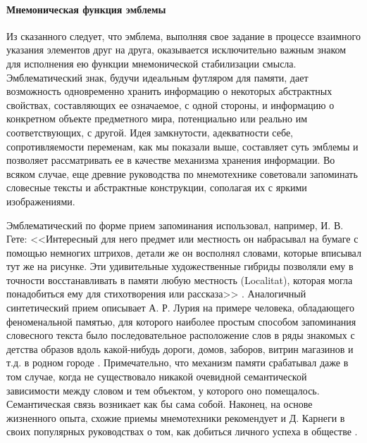\paragraph{Мнемоническая функция эмблемы}

Из сказанного следует, что эмблема, выполняя свое задание в процессе взаимного указания элементов
друг на друга, оказывается исключительно важным знаком для исполнения ею функции мнемонической
стабилизации смысла. Эмблематический знак, будучи идеальным футляром для памяти, дает возможность
одновременно хранить информацию о некоторых абстрактных свойствах, составляющих ее означаемое, с
одной стороны, и информацию о конкретном объекте предметного мира, потенциально или реально им
соответствующих, с другой. Идея замкнутости, адекватности себе, сопротивляемости переменам, как мы
показали выше, составляет суть эмблемы и позволяет рассматривать ее в качестве механизма хранения
информации. Во всяком случае, еще древние руководства по мнемотехнике советовали запоминать
словесные тексты и абстрактные конструкции, сополагая их с яркими изображениями\autocite[][49]{grigoreva2005}.

Эмблематический по форме прием запоминания использовал, например, И. В. Гете: <<Интересный для него
предмет или местность он набрасывал на бумаге с помощью немногих штрихов, детали же он восполнял
словами, которые вписывал тут же на рисунке. Эти удивительные художественные гибриды позволяли ему в
точности восстанавливать в памяти любую местность (Localitat), которая могла понадобиться ему для
стихотворения или рассказа>> \autocite{bahtin1979}\autocite[][219]{bahtin1979full}. Аналогичный
синтетический прием описывает А. Р. Лурия на примере человека, обладающего феноменальной памятью,
для которого наиболее простым способом запоминания словесного текста было последовательное
расположение слов в ряды знакомых с детства образов вдоль какой-нибудь дороги, домов, заборов,
витрин магазинов и т.д. в родном городе \autocite[]{luria1979}.
Примечательно, что механизм памяти срабатывал даже в том случае, когда не
существовало никакой очевидной семантической зависимости между словом и тем объектом, у которого оно
помещалось. Семантическая связь возникает как бы сама собой. Наконец, на основе жизненного опыта,
схожие приемы мнемотехники рекомендует и Д. Карнеги в своих популярных руководствах о том, как
добиться личного успеха в обществе \autocite[][237--420]{karnegi1996}.


